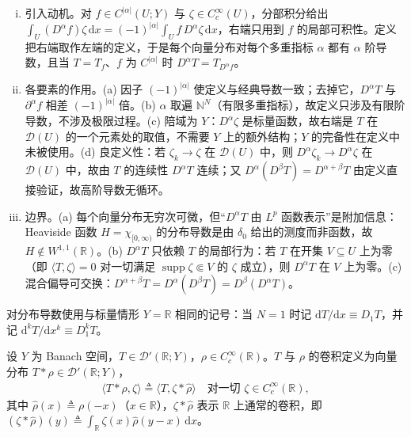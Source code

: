 \documentclass[../../main.tex]{subfiles}%
\begin{document}
\begin{remark}\label{remark:ch04-分布导数动机}
\begin{enumerate}[(i)]
\item 引入动机。对 $f\in C^{|\alpha|}(U;Y)$ 与 $\zeta\in C_c^\infty(U)$，分部积分给出 $\int_U(D^\alpha f)\zeta\,\mathrm{d}x=(-1)^{|\alpha|}\int_Uf\,D^\alpha\zeta\,\mathrm{d}x$，右端只用到 $f$ 的局部可积性。定义把右端取作左端的定义，于是每个向量分布对每个多重指标 $\alpha$ 都有 $\alpha$ 阶导数，且当 $T=T_f$、$f$ 为 $C^{|\alpha|}$ 时 $D^\alpha T=T_{D^\alpha f}$。

\item 各要素的作用。(a) 因子 $(-1)^{|\alpha|}$ 使定义与经典导数一致；去掉它，$D^\alpha T$ 与 $\partial^\alpha f$ 相差 $(-1)^{|\alpha|}$ 倍。(b) $\alpha$ 取遍 $\mathbb{N}^N$（有限多重指标），故定义只涉及有限阶导数，不涉及极限过程。(c) 陪域为 $Y$：$D^\alpha\zeta$ 是标量函数，故右端是 $T$ 在 $\mathcal{D}(U)$ 的一个元素处的取值，不需要 $Y$ 上的额外结构；$Y$ 的完备性在定义中未被使用。(d) 良定义性：若 $\zeta_k\to\zeta$ 在 $\mathcal{D}(U)$ 中，则 $D^\alpha\zeta_k\to D^\alpha\zeta$ 在 $\mathcal{D}(U)$ 中，故由 $T$ 的连续性 $D^\alpha T$ 连续；又 $D^\alpha(D^\beta T)=D^{\alpha+\beta}T$ 由定义直接验证，故高阶导数无循环。

\item 边界。(a) 每个向量分布无穷次可微，但“$D^\alpha T$ 由 $L^p$ 函数表示”是附加信息：Heaviside 函数 $H=\chi_{[0,\infty)}$ 的分布导数是由 $\delta_0$ 给出的测度而非函数，故 $H\notin W^{1,1}(\mathbb{R})$。(b) $D^\alpha T$ 只依赖 $T$ 的局部行为：若 $T$ 在开集 $V\subseteq U$ 上为零（即 $\langle T,\zeta\rangle=0$ 对一切满足 $\operatorname{supp}\zeta\Subset V$ 的 $\zeta$ 成立），则 $D^\alpha T$ 在 $V$ 上为零。(c) 混合偏导可交换：$D^{\alpha+\beta}T=D^\alpha(D^\beta T)=D^\beta(D^\alpha T)$。
\end{enumerate}
\end{remark}

对分布导数使用与标量情形 $Y=\mathbb{R}$ 相同的记号：当 $N=1$ 时记 $\mathrm{d}T/\mathrm{d}x\equiv D_1T$，并记 $\mathrm{d}^kT/\mathrm{d}x^k\equiv D_1^kT$。

\begin{definition}[分布卷积]\label{definition:ch04-分布卷积}
设 $Y$ 为 Banach 空间，$T\in\mathcal{D}'(\mathbb{R};Y)$，$\rho\in C_c^\infty(\mathbb{R})$。$T$ 与 $\rho$ 的卷积定义为向量分布 $T*\rho\in\mathcal{D}'(\mathbb{R};Y)$，
\begin{align*}
\langle T*\rho,\zeta\rangle\triangleq\langle T,\zeta*\hat\rho\rangle\quad\text{对一切 }\zeta\in C_c^\infty(\mathbb{R}),
\end{align*}
其中 $\hat\rho(x)\triangleq\rho(-x)$（$x\in\mathbb{R}$），$\zeta*\hat\rho$ 表示 $\mathbb{R}$ 上通常的卷积，即 $(\zeta*\hat\rho)(y)\triangleq\int_{\mathbb{R}}\zeta(x)\hat\rho(y-x)\,\mathrm{d}x$。
\end{definition}
\end{document}
